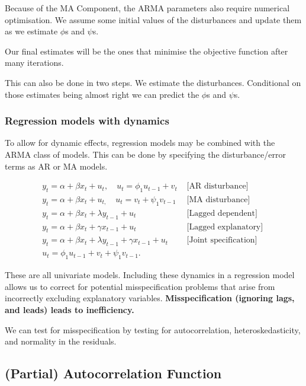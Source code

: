 \documentclass[11pt]{article}
\begin{document}
Because of the MA Component, the ARMA parameters also require numerical optimisation. We assume some initial values of the disturbances and update them as we estimate $\phi$s and $\psi$s.

Our final estimates will be the ones that minimise the objective function after many iterations.
\begin{note}
    This can also be done in two steps. We estimate the disturbances. Conditional on those estimates being almost right we can predict the $\phi$s and $\psi$s.
\end{note}

\subsubsection{Regression models with dynamics}

To allow for dynamic effects, regression models may be combined with the ARMA class of models. This can be done by specifying the disturbance/error terms as AR or MA models.

\begin{align*}
    y_t=\alpha+\beta x_t+u_t, \quad u_t=\phi_1 u_{t-1}+v_t & \text { [AR disturbance] } \\
    y_t=\alpha+\beta x_t+u_{t,} \quad u_t=v_t+\psi_1 v_{t-1} & \text { [MA disturbance] } \\
    y_t=\alpha+\beta x_t+\lambda y_{t-1}+u_t & \text { [Lagged dependent] } \\
    y_t=\alpha+\beta x_t+\gamma x_{t-1}+u_t & \text { [Lagged explanatory] } \\
    y_t=\alpha+\beta x_t+\lambda y_{t-1}+\gamma x_{t-1}+u_t & \text { [Joint specification] } \\
    u_t=\phi_1 u_{t-1}+v_t+\psi_1 v_{t-1} . &
\end{align*}

These are all univariate models. Including these dynamics in a regression model allows us to correct for potential misspecification problems that arise from incorrectly excluding explanatory variables. \textbf{Misspecification (ignoring lags, and leads) leads to inefficiency.}


We can test for misspecification by testing for autocorrelation, heteroskedasticity, and normality in the residuals.

\subsection{(Partial) Autocorrelation Function}
\end{document}
